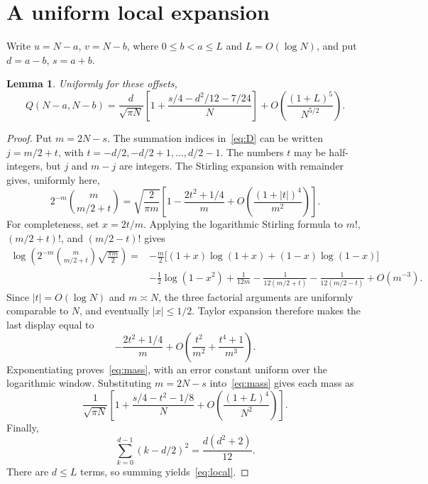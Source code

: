\documentclass[11pt]{article}
\newtheorem{lemma}[theorem]{Lemma}
\begin{document}
\section{A uniform local expansion}

Write $u=N-a$, $v=N-b$, where $0\le b<a\le L$ and
$L=O(\log N)$, and put $d=a-b$, $s=a+b$.

\begin{lemma}\label{lem:local}
Uniformly for these offsets,
\begin{equation}\label{eq:local}
 Q(N-a,N-b)=\frac{d}{\sqrt{\pi N}}
 \left[1+\frac{s/4-d^2/12-7/24}{N}\right]
 +O\left(\frac{(1+L)^5}{N^{5/2}}\right).
\end{equation}
\end{lemma}

\begin{proof}
Put $m=2N-s$. The summation indices in~\eqref{eq:D} can be written
$j=m/2+t$, with $t=-d/2,-d/2+1,\ldots,d/2-1$.
The numbers $t$ may be half-integers, but $j$ and $m-j$ are integers.
The Stirling expansion with remainder gives, uniformly here,
\begin{equation}\label{eq:mass}
 2^{-m}\binom m{m/2+t}
 =\sqrt{\frac2{\pi m}}
 \left[1-\frac{2t^2+1/4}{m}
 +O\left(\frac{(1+|t|)^4}{m^2}\right)\right].
\end{equation}
For completeness, set $x=2t/m$. Applying the logarithmic Stirling
formula to $m!$, $(m/2+t)!$, and $(m/2-t)!$ gives
\begin{align*}
 \log\!\left(2^{-m}\binom m{m/2+t}\sqrt{\frac{\pi m}{2}}\right)
 ={}&-\frac m2\bigl[(1+x)\log(1+x)+(1-x)\log(1-x)\bigr]\\
 &-\frac12\log(1-x^2)+\frac1{12m}
 -\frac1{12(m/2+t)}-\frac1{12(m/2-t)}+O(m^{-3}).
\end{align*}
Since $|t|=O(\log N)$ and $m\asymp N$, the three factorial arguments
are uniformly comparable to $N$, and eventually $|x|\le1/2$.
Taylor expansion therefore makes the last display equal to
\[
 -\frac{2t^2+1/4}{m}
 +O\left(\frac{t^2}{m^2}+\frac{t^4+1}{m^3}\right).
\]
Exponentiating proves~\eqref{eq:mass}, with an error constant uniform
over the logarithmic window.
Substituting $m=2N-s$ into~\eqref{eq:mass} gives each mass as
\[
 \frac1{\sqrt{\pi N}}
 \left[1+\frac{s/4-t^2-1/8}{N}
 +O\left(\frac{(1+L)^4}{N^2}\right)\right].
\]
Finally,
\[
 \sum_{k=0}^{d-1}(k-d/2)^2=\frac{d(d^2+2)}{12}.
\]
There are $d\le L$ terms, so summing yields~\eqref{eq:local}.
\end{proof}
\end{document}
